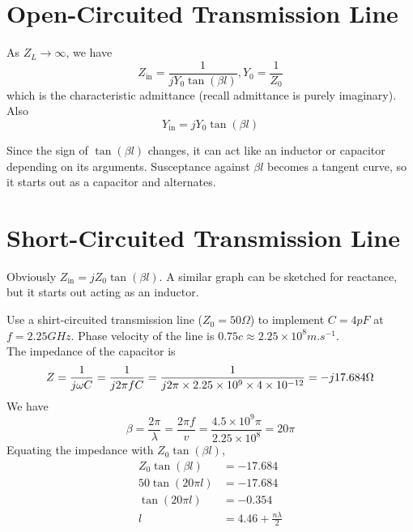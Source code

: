 \documentclass[12pt]{article}
\begin{document}
\section{Open-Circuited Transmission Line}

As $Z_L \rightarrow \infty$, we have
$$Z_{\text{in}} = \frac{1}{jY_0\tan(\beta l)}, Y_0 = \frac{1}{Z_0}$$
which is the characteristic admittance (recall admittance is purely imaginary). Also
$$Y_{\text{in}} = jY_0\tan(\beta l)$$

Since the sign of $\tan(\beta l)$ changes, it can act like an inductor or capacitor depending on its arguments. Susceptance against $\beta l$ becomes a tangent curve, so it starts out as a capacitor and alternates.

\section{Short-Circuited Transmission Line}

Obviously $Z_{\text{in}} = jZ_0\tan(\beta l)$. A similar graph can be sketched for reactance, but it starts out acting as an inductor.

\begin{ex}
    Use a shirt-circuited transmission line ($Z_0 = 50\unit{\Omega}$) to implement $C = 4\unit{pF}$ at $f = 2.25\unit{GHz}$. Phase velocity of the line is $0.75c \approx 2.25 \times 10^8\unit{m.s^{-1}}$. \\
    The impedance of the capacitor is
    $$Z = \frac{1}{j\omega C} = \frac{1}{j2\pi fC} = \frac{1}{j2\pi\times2.25\times10^9\times4\times10^{-12}} = -j17.684\unit\Omega$$
    We have
    $$\beta = \frac{2\pi}{\lambda} = \frac{2\pi f}{v} = \frac{4.5\times10^9\pi}{2.25\times10^8} = 20\pi$$
    Equating the impedance with $Z_0\tan(\beta l)$,
    \begin{align*}
        Z_0\tan(\beta l) &= -17.684 \\
        50\tan(20\pi l) &= -17.684 \\
        \tan(20\pi l) &= -0.354 \\
        l &= 4.46 + \frac{n\lambda}{2}
    \end{align*}
\end{ex}
\end{document}
